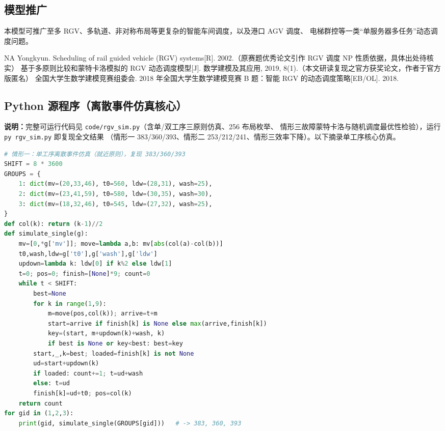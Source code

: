 \documentclass{cumcmthesis}
\begin{document}
\subsection{模型推广}
本模型可推广至多 RGV、多轨道、非对称布局等更复杂的智能车间调度，以及港口 AGV 调度、
电梯群控等一类“单服务器多任务”动态调度问题。

\begin{thebibliography}{9}
     NA Yongkyun. Scheduling of rail guided vehicle (RGV) systems[R]. 2002.（原赛题优秀论文引作 RGV 调度 NP 性质依据，具体出处待核实）
     基于多原则比较和蒙特卡洛模拟的 RGV 动态调度模型[J]. 数学建模及其应用, 2019, 8(1).（本文研读复现之官方获奖论文，作者于官方版匿名）
     全国大学生数学建模竞赛组委会. 2018 年全国大学生数学建模竞赛 B 题：智能 RGV 的动态调度策略[EB/OL]. 2018.
\end{thebibliography}

\newpage
\begin{appendices}
\section{Python 源程序（离散事件仿真核心）}
\textbf{说明：}完整可运行代码见 \texttt{code/rgv\_sim.py}（含单/双工序三原则仿真、256 布局枚举、
情形三故障蒙特卡洛与随机调度最优性检验），运行 \texttt{py rgv\_sim.py} 即复现全文结果
（情形一 383/360/393、情形二 253/212/241、情形三效率下降）。以下摘录单工序核心仿真。
\begin{lstlisting}[language=python]
# 情形一：单工序离散事件仿真（就近原则），复现 383/360/393
SHIFT = 8 * 3600
GROUPS = {
    1: dict(mv=(20,33,46), t0=560, ldw=(28,31), wash=25),
    2: dict(mv=(23,41,59), t0=580, ldw=(30,35), wash=30),
    3: dict(mv=(18,32,46), t0=545, ldw=(27,32), wash=25),
}
def col(k): return (k-1)//2
def simulate_single(g):
    mv=[0,*g['mv']]; move=lambda a,b: mv[abs(col(a)-col(b))]
    t0,wash,ldw=g['t0'],g['wash'],g['ldw']
    updown=lambda k: ldw[0] if k%2 else ldw[1]
    t=0; pos=0; finish=[None]*9; count=0
    while t < SHIFT:
        best=None
        for k in range(1,9):
            m=move(pos,col(k)); arrive=t+m
            start=arrive if finish[k] is None else max(arrive,finish[k])
            key=(start, m+updown(k)+wash, k)
            if best is None or key<best: best=key
        start,_,k=best; loaded=finish[k] is not None
        ud=start+updown(k)
        if loaded: count+=1; t=ud+wash
        else: t=ud
        finish[k]=ud+t0; pos=col(k)
    return count
for gid in (1,2,3):
    print(gid, simulate_single(GROUPS[gid]))   # -> 383, 360, 393
\end{lstlisting}
\end{appendices}
\end{document}
